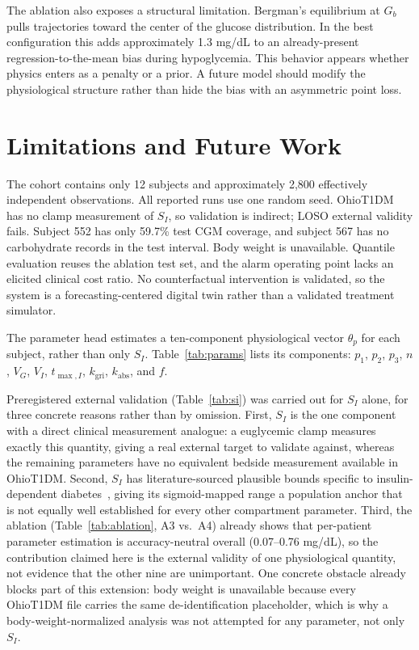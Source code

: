 \documentclass[journal]{IEEEtran}
\begin{document}
The ablation also exposes a structural limitation. Bergman's equilibrium at $G_b$ pulls trajectories toward the center of the glucose distribution. In the best configuration this adds approximately 1.3 mg/dL to an already-present regression-to-the-mean bias during hypoglycemia. This behavior appears whether physics enters as a penalty or a prior. A future model should modify the physiological structure rather than hide the bias with an asymmetric point loss.

\section{Limitations and Future Work}

The cohort contains only 12 subjects and approximately 2,800 effectively independent observations. All reported runs use one random seed. OhioT1DM has no clamp measurement of $S_I$, so validation is indirect; LOSO external validity fails. Subject 552 has only 59.7\% test CGM coverage, and subject 567 has no carbohydrate records in the test interval. Body weight is unavailable. Quantile evaluation reuses the ablation test set, and the alarm operating point lacks an elicited clinical cost ratio. No counterfactual intervention is validated, so the system is a forecasting-centered digital twin rather than a validated treatment simulator.

The parameter head estimates a ten-component physiological vector $\theta_p$ for each subject, rather than only $S_I$. Table~\ref{tab:params} lists its components: $p_1$, $p_2$, $p_3$, $n$, $V_G$, $V_I$, $t_{\max,I}$, $k_{\text{gri}}$, $k_{\text{abs}}$, and $f$.

Preregistered external validation (Table~\ref{tab:si}) was carried out for $S_I$ alone, for three concrete reasons rather than by omission. First, $S_I$ is the one component with a direct clinical measurement analogue: a euglycemic clamp measures exactly this quantity, giving a real external target to validate against, whereas the remaining parameters have no equivalent bedside measurement available in OhioT1DM\@. Second, $S_I$ has literature-sourced plausible bounds specific to insulin-dependent diabetes~\cite{ref33}, giving its sigmoid-mapped range a population anchor that is not equally well established for every other compartment parameter. Third, the ablation (Table~\ref{tab:ablation}, A3 vs.\ A4) already shows that per-patient parameter estimation is accuracy-neutral overall (0.07--0.76 mg/dL), so the contribution claimed here is the external validity of one physiological quantity, not evidence that the other nine are unimportant. One concrete obstacle already blocks part of this extension: body weight is unavailable because every OhioT1DM file carries the same de-identification placeholder, which is why a body-weight-normalized analysis was not attempted for any parameter, not only $S_I$.
\end{document}
